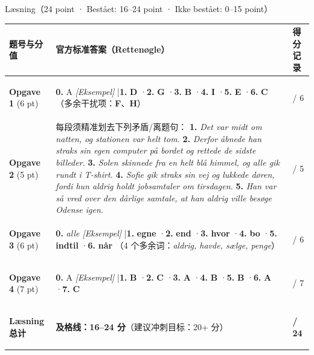 \begin{grammatikbox}{Læsning（24 point · Bestået: 16--24 point · Ikke bestået: 0--15 point）}
\small
\renewcommand{\arraystretch}{1.24}
\begin{tabularx}{\linewidth}{@{} >{\bfseries\color{NCDNavy}\raggedright\arraybackslash}p{3.0cm} >{\raggedright\arraybackslash}X >{\centering\arraybackslash}p{2.0cm} @{}}
\toprule
\textbf{题号与分值} & \textbf{官方标准答案（Rettenøgle）} & \textbf{得分记录} \\
\midrule
\textbf{Opgave 1} (6 pt) &
\textbf{0.} A \textit{[Eksempel]} \quad|\quad \textbf{1.} \textbf{D} \quad·\quad \textbf{2.} \textbf{G} \quad·\quad \textbf{3.} \textbf{B} \quad·\quad \textbf{4.} \textbf{I} \quad·\quad \textbf{5.} \textbf{E} \quad·\quad \textbf{6.} \textbf{C}\newline
（多余干扰项：\textbf{F}、\textbf{H}） & \underline{\hspace{0.7cm}} / 6 \\
\midrule
\textbf{Opgave 2} (5 pt) &
每段须精准划去下列矛盾/离题句：\newline
\textbf{1.} \textit{Det var midt om natten, og stationen var helt tom.}\newline
\textbf{2.} \textit{Derfor åbnede han straks sin egen computer på bordet og rettede de sidste billeder.}\newline
\textbf{3.} \textit{Solen skinnede fra en helt blå himmel, og alle gik rundt i T-shirt.}\newline
\textbf{4.} \textit{Sofie gik straks sin vej og lukkede døren, fordi hun aldrig holdt jobsamtaler om tirsdagen.}\newline
\textbf{5.} \textit{Han var så vred over den dårlige samtale, at han aldrig ville besøge Odense igen.} & \underline{\hspace{0.7cm}} / 5 \\
\midrule
\textbf{Opgave 3} (6 pt) &
\textbf{0.} \textit{alle [Eksempel]} \quad|\quad \textbf{1.} \textbf{egne} \quad·\quad \textbf{2.} \textbf{end} \quad·\quad \textbf{3.} \textbf{hvor} \quad·\quad \textbf{4.} \textbf{bo} \quad·\quad \textbf{5.} \textbf{indtil} \quad·\quad \textbf{6.} \textbf{når}\newline
（4 个多余词：\textit{aldrig, havde, sælge, penge}） & \underline{\hspace{0.7cm}} / 6 \\
\midrule
\textbf{Opgave 4} (7 pt) &
\textbf{0.} A \textit{[Eksempel]} \quad|\quad \textbf{1.} \textbf{B} \quad·\quad \textbf{2.} \textbf{C} \quad·\quad \textbf{3.} \textbf{A} \quad·\quad \textbf{4.} \textbf{B} \quad·\quad \textbf{5.} \textbf{B} \quad·\quad \textbf{6.} \textbf{A} \quad·\quad \textbf{7.} \textbf{C} & \underline{\hspace{0.7cm}} / 7 \\
\midrule
\textbf{Læsning 总计} & \textbf{及格线：16--24 分}（建议冲刺目标：20+ 分） & \textbf{\underline{\hspace{0.7cm}} / 24} \\
\bottomrule
\end{tabularx}
\end{grammatikbox}

